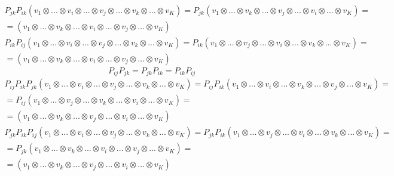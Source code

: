 \documentclass[12pt]{article}
\theoremstyle{definition}
\begin{document}
\begin{enumerate}
\begin{itemize}
\begin{multline}
        \end{multline}
        \begin{multline}
            P_{jk}P_{ik}(v_1 \otimes ... \otimes v_i \otimes ... \otimes v_j \otimes ...\otimes v_k\otimes ... \otimes v_K)=P_{jk}(v_1 \otimes ... \otimes v_k \otimes ... \otimes v_j \otimes ...\otimes v_i\otimes ... \otimes v_K)=\\=(v_1 \otimes ... \otimes v_k \otimes ... \otimes v_i \otimes ...\otimes v_j\otimes ... \otimes v_K)
        \end{multline}
        \begin{multline}
            P_{ik}P_{ij}(v_1 \otimes ... \otimes v_i \otimes ... \otimes v_j \otimes ...\otimes v_k\otimes ... \otimes v_K)=P_{ik}(v_1 \otimes ... \otimes v_j \otimes ... \otimes v_i \otimes ...\otimes v_k\otimes ... \otimes v_K)=\\=(v_1 \otimes ... \otimes v_k \otimes ... \otimes v_i \otimes ...\otimes v_j\otimes ... \otimes v_K)
        \end{multline}
        \begin{equation}
            \boxed{P_{ij}P_{jk}=P_{jk}P_{ik}=P_{ik}P_{ij}}
        \end{equation}
        \begin{multline}
            P_{ij}P_{ik}P_{jk}(v_1 \otimes ... \otimes v_i \otimes ... \otimes v_j \otimes ...\otimes v_k\otimes ... \otimes v_K)=P_{ij}P_{ik}(v_1 \otimes ... \otimes v_i \otimes ... \otimes v_k \otimes ...\otimes v_j\otimes ... \otimes v_K)=\\=P_{ij}(v_1 \otimes ... \otimes v_j \otimes ... \otimes v_k \otimes ...\otimes v_i\otimes ... \otimes v_K)=\\=(v_1 \otimes ... \otimes v_k \otimes ... \otimes v_j \otimes ...\otimes v_i\otimes ... \otimes v_K)
        \end{multline}
        \begin{multline}
            P_{jk}P_{ik}P_{ij}(v_1 \otimes ... \otimes v_i \otimes ... \otimes v_j \otimes ...\otimes v_k\otimes ... \otimes v_K)=P_{jk}P_{ik}(v_1 \otimes ... \otimes v_j \otimes ... \otimes v_i \otimes ...\otimes v_k\otimes ... \otimes v_K)=\\=P_{jk}(v_1 \otimes ... \otimes v_k \otimes ... \otimes v_i \otimes ...\otimes v_j\otimes ... \otimes v_K)=\\=(v_1 \otimes ... \otimes v_k \otimes ... \otimes v_j \otimes ...\otimes v_i\otimes ... \otimes v_K)
        \end{multline}
        \begin{equation}

\end{equation}
\end{itemize}
\end{enumerate}
\end{document}
